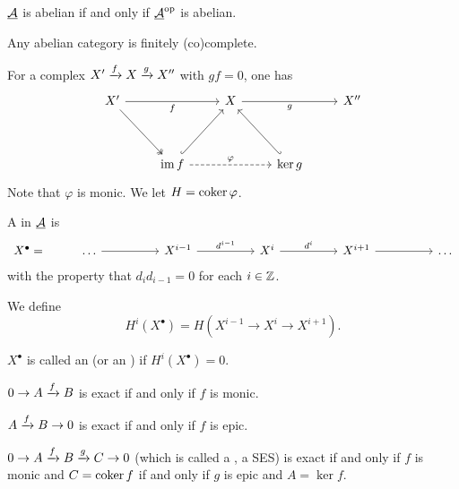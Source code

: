 \begin{remarks*}
	\item \( \underline{\mathcal{A}} \) is abelian if and only if \( \underline{\mathcal{A}}^\mathrm{op} \) is abelian.
	\item Any abelian category is finitely (co)complete.
\end{remarks*}

For a complex \( X' \xrightarrow{f} X \xrightarrow{g} X'' \) with \( gf = 0 \), one has
\[
	\begin{tikzcd}{X'} && X && {X''} \\
		\\
		& {\im f} && {\ker g}
		\arrow["f"', from=1-1, to=1-3]
		\arrow[two heads, from=1-1, to=3-2]
		\arrow["g"', from=1-3, to=1-5]
		\arrow[hook, from=3-2, to=1-3]
		\arrow["\varphi", dashed, from=3-2, to=3-4]
		\arrow[hook', from=3-4, to=1-3]
	\end{tikzcd}
\]
Note that \( \varphi \) is monic. We let \( H = \operatorname{coker} \varphi \).

\begin{definition*}
	A  in \( \underline{\mathcal{A}} \) is
	\[
		\begin{tikzcd}{X^\bullet=} & \dotsc && {X^{i - 1}} && {X^i} && {X^{i + 1}} && \dotsc
			\arrow[from=1-2, to=1-4]
			\arrow["{d^{i - 1}}", from=1-4, to=1-6]
			\arrow["{d^i}", from=1-6, to=1-8]
			\arrow[from=1-8, to=1-10]
		\end{tikzcd}
	\]
	with the property that \( d_{i} d_{i - 1} = 0 \) for each \( i \in \mathbb{Z} \).
\end{definition*}

We define
\[
	H^i(X^\bullet) = H(X^{i - 1} \to X^i \to X^{i + 1}).
\]

\begin{definition*}
	\( X^\bullet \) is called an  (or an ) if \( H^i(X^\bullet) = 0 \).
\end{definition*}

\begin{examples*}
	\item \( 0 \to A \xrightarrow{f} B \) is exact if and only if \( f \) is monic.
	\item \( A \xrightarrow{f} B \to 0 \) is exact  if and only if \( f \) is epic.
	\item \( 0 \to A \xrightarrow{f} B \xrightarrow{g} C \to 0 \) (which is called a , a SES) is exact if and only if \( f \) is monic and \( C = \operatorname{coker} f \) if and only if \( g \) is epic and \( A = \ker f \).
\end{examples*}

